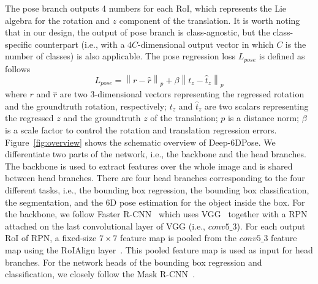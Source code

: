 \documentclass[conference]{IEEEtran}
\newcommand\red[1]{{\color{black}#1}}
\newcommand{\iancomment}[1]{\red{IAN: #1}}
\newcommand{\method}[1]{Deep-6DPose}
\newcommand\norm[1]{\left\lVert#1\right\rVert}
\begin{document}
The pose branch outputs 4 numbers for each RoI, which represents the Lie algebra for the rotation and $z$ component of the translation. It is worth noting that in our design, the output of pose branch is class-agnostic, %
but the class-specific counterpart (i.e., with a $4C$-dimensional output vector in which $C$ is the number of classes) is also applicable. 
The pose regression loss $L_{pose}$ is defined as follows
\begin{equation}
L_{pose} = \norm{r-\hat{r}}_p + \beta\norm{t_z - \hat{t}_z}_p
\label{eq:poseloss}
\end{equation}
where $r$ and $\hat{r}$ are two 3-dimensional vectors representing the regressed rotation and the groundtruth rotation, respectively; $t_z$ and $\hat{t}_z$ are two scalars representing the regressed $z$ and the groundtruth $z$ of the translation; $p$ is a distance norm; $\beta$ is a scale factor to control the rotation and translation regression errors. %
Figure~\ref{fig:overview} shows the schematic overview of \method{}. We differentiate two parts of the network, i.e., the backbone and the head branches. The backbone is used to extract features over the whole image and is shared between head branches. There are four head branches corresponding to the four different tasks, i.e., the bounding box regression, the bounding box classification, the segmentation, and the 6D pose estimation for the object inside the box. 
For the backbone, we follow Faster R-CNN~\cite{Faster-RCNN} which uses VGG~\cite{SimonyanZ14} together with a RPN attached on the last convolutional layer of VGG (i.e., $conv5\_3$). For each output RoI of RPN, a fixed-size $7\times7$ feature map is pooled from the $conv5\_3$ feature map using the RoIAlign layer~\cite{Mask-RCNN}. This pooled feature map is used as input for head branches. For the network heads of the bounding box regression and classification, we closely follow the Mask R-CNN~\cite{Mask-RCNN}. 
\end{document}
